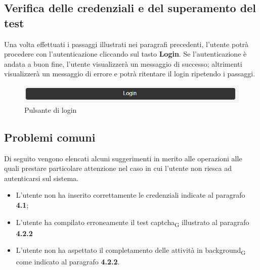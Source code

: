 \subsection{Verifica delle credenziali e del superamento del test}
Una volta effettuati i passaggi illustrati nei paragrafi precedenti, l'utente potrà procedere con l'autenticazione cliccando sul tasto \textbf{Login}. Se l'autenticazione è andata a buon fine, l'utente visualizzerà un messaggio di successo; altrimenti visualizzerà un messaggio di errore e potrà ritentare il login ripetendo i passaggi.

\begin{figure}[H]
    \centering
    \includegraphics[scale=0.8]{img/tastologin.png}
    \caption{Pulsante di login}
\end{figure}   

\subsection{Problemi comuni}
Di seguito vengono elencati alcuni suggerimenti in merito alle operazioni alle quali prestare particolare attenzione nel caso in cui l'utente non riesca ad autenticarsi sul sistema.
\begin{itemize}
	\item L'utente non ha inserito correttamente le credenziali indicate al paragrafo \textbf{4.1};
    \item L'utente ha compilato erroneamente il test captcha\textsubscript{G} illustrato al paragrafo \textbf{4.2.2}
    \item L'utente non ha aspettato il completamento delle attività in background\textsubscript{G} come indicato al paragrafo \textbf{4.2.2}.
\end{itemize} 